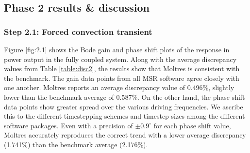 \subsection{Phase 2 results \& discussion}


\subsubsection{Step 2.1: Forced convection transient}

Figure \ref{fig:2.1} shows the Bode gain and phase shift plots of the response
in power output in the fully coupled system. Along with the average discrepancy
values from Table \ref{table:disc2}, the results show that Moltres is
consistent with the benchmark. The gain data points from all \gls{MSR} software
agree closely with one another. Moltres reports an average discrepancy value of
0.496\%, slightly lower than the benchmark average of 0.587\%. On the other
hand, the phase shift data points show greater spread over the various driving
frequencies. We ascribe this to the different timestepping schemes and timestep
sizes among the different software packages. Even with a precision of
$\pm0.9^\circ$ for each phase shift value, Moltres accurately reproduces the
correct trend with a lower average discrepancy (1.741\%) than the benchmark
average (2.176\%).

